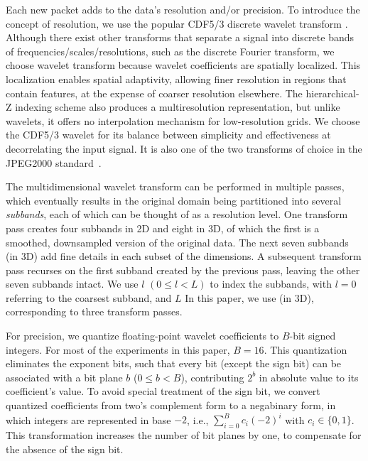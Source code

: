 Each new packet adds to the data's resolution and/or precision. To introduce
the concept of resolution, we use the popular CDF5/3 discrete wavelet transform
\todo{[CITE]}.  Although there exist other transforms that separate a signal
into discrete bands of frequencies/scales/resolutions, such as the discrete
Fourier transform, we choose wavelet transform because wavelet coefficients are
spatially localized. This localization enables spatial adaptivity, allowing
finer resolution in regions that contain  
features, at the expense of coarser resolution elsewhere. The hierarchical-Z
indexing scheme \todo{[CITE]} also produces a multiresolution representation,
but unlike wavelets, it offers no interpolation mechanism for low-resolution
grids. We choose the CDF5/3 wavelet for its balance between simplicity and
effectiveness at decorrelating the input signal. It is also one of the two
transforms of choice in the JPEG2000 standard~\cite{jpeg2001}.

The  multidimensional wavelet transform can be performed in
multiple passes, which eventually results in the original domain being
partitioned into several \emph{subbands}, each of which can be thought of as a
resolution level. One transform pass creates four subbands in 2D and eight in
3D, of which the first is a smoothed, downsampled version of the original data.
The next seven subbands (in 3D) add fine details in each subset of the
dimensions. A subsequent transform pass  recurses on the first
subband created by the previous pass, leaving the other seven subbands intact.
We  use $l$ $(0 \leq l < L)$ to index the subbands, with $l =
0$ referring to the coarsest subband, and $L$   In this paper, we use
  (in 3D), corresponding to three transform passes.

For  precision, we quantize
floating-point wavelet coefficients to $B$-bit signed integers. For most of the
experiments in this paper, $B=16$. This quantization eliminates the exponent
bits, such that every bit (except the sign bit) can be associated with a bit
plane $b$ ($0\leq b < B$), contributing $2^b$ in absolute value to its
coefficient's value. To avoid special treatment of the sign bit, we
convert quantized coefficients from two's complement form to a negabinary form,
in which integers are represented in base $-2$, i.e.,
$\sum_{i=0}^{B}{c_i(-2)^i}$ with $c_i\in \{0,1\}$. This transformation
increases the number of bit planes by one, to compensate for the absence of the
sign bit.    

